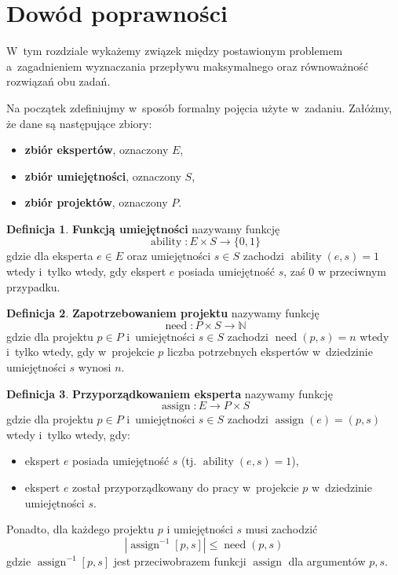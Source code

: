 \documentclass[12pt,a4paper]{article}
\theoremstyle{definition}
\newtheorem{defn}{Definicja}
\DeclareMathOperator{\ability}{ability}
\DeclareMathOperator{\need}{need}
\DeclareMathOperator{\assign}{assign}
\begin{document}
\section{Dowód poprawności}

W~tym rozdziale wykażemy związek między postawionym problemem a~zagadnieniem
wyznaczania przepływu maksymalnego oraz równoważność rozwiązań obu zadań.

Na początek zdefiniujmy w~sposób formalny pojęcia użyte w~zadaniu.
Załóżmy, że dane są następujące zbiory:

\begin{itemize}
	\item \textbf{zbiór ekspertów}, oznaczony $E$,
	\item \textbf{zbiór umiejętności}, oznaczony $S$,
	\item \textbf{zbiór projektów}, oznaczony $P$.
\end{itemize}

\begin{defn}
\textbf{Funkcją umiejętności} nazywamy funkcję
$$ \ability : E \times S \to \{ 0,1 \} $$
gdzie dla eksperta $e \in E$ oraz umiejętności $s \in S$ zachodzi
$\ability(e, s) = 1$ wtedy i~tylko wtedy, gdy ekspert $e$ posiada umiejętność
$s$, zaś 0 w przeciwnym przypadku.
\end{defn}

\begin{defn}
\textbf{Zapotrzebowaniem projektu} nazywamy funkcję
$$ \need : P \times S \to \mathbb{N} $$
gdzie dla projektu $p \in P$ i~umiejętności $s \in S$ zachodzi $\need(p, s) = n$
wtedy i~tylko wtedy, gdy w~projekcie $p$ liczba potrzebnych ekspertów
w~dziedzinie umiejętności $s$ wynosi $n$.
\end{defn}

\begin{defn}
\textbf{Przyporządkowaniem eksperta} nazywamy funkcję
$$ \assign : E \to P \times S $$
gdzie dla projektu $p \in P$ i~umiejętności $s \in S$ zachodzi
$\assign(e) = (p,s)$ wtedy i~tylko wtedy, gdy:
\begin{itemize}
	\item ekspert $e$ posiada umiejętność $s$ (tj. $\ability(e,s) = 1$),
	\item ekspert $e$ został przyporządkowany do pracy w~projekcie $p$
	w~dziedzinie umiejętności $s$.
\end{itemize}
Ponadto, dla każdego projektu $p$ i umiejętności $s$ musi zachodzić
$$ \left| \assign^{-1}[p,s] \right| \leq \need(p,s) $$
gdzie $\assign^{-1}[p,s]$ jest przeciwobrazem funkcji $\assign$ dla argumentów
$p,s$.
\end{defn}
\end{document}
